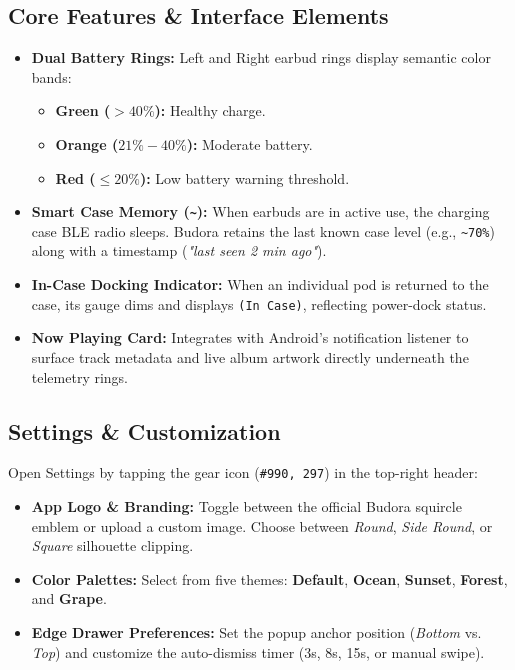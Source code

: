 \documentclass[11pt,a4paper]{article}
\begin{document}
\subsection{Core Features \& Interface Elements}
\begin{itemize}
    \item \textbf{Dual Battery Rings:} Left and Right earbud rings display semantic color bands:
    \begin{itemize}
        \item \color{BudoraGreen}\textbf{Green ($> 40\%$):} \color{black} Healthy charge.
        \item \color{BudoraOrange}\textbf{Orange ($21\% - 40\%$):} \color{black} Moderate battery.
        \item \color{BudoraRed}\textbf{Red ($\le 20\%$):} \color{black} Low battery warning threshold.
    \end{itemize}
    \item \textbf{Smart Case Memory (\texttt{\~{}}):} When earbuds are in active use, the charging case BLE radio sleeps. Budora retains the last known case level (e.g., \texttt{\~{}70\%}) along with a timestamp (\textit{"last seen 2 min ago"}).
    \item \textbf{In-Case Docking Indicator:} When an individual pod is returned to the case, its gauge dims and displays \texttt{(In Case)}, reflecting power-dock status.
    \item \textbf{Now Playing Card:} Integrates with Android's notification listener to surface track metadata and live album artwork directly underneath the telemetry rings.
\end{itemize}

\subsection{Settings \& Customization}
Open Settings by tapping the gear icon (\texttt{\#990, 297}) in the top-right header:
\begin{itemize}
    \item \textbf{App Logo \& Branding:} Toggle between the official Budora squircle emblem or upload a custom image. Choose between \textit{Round}, \textit{Side Round}, or \textit{Square} silhouette clipping.
    \item \textbf{Color Palettes:} Select from five themes: \textbf{Default}, \textbf{Ocean}, \textbf{Sunset}, \textbf{Forest}, and \textbf{Grape}.
    \item \textbf{Edge Drawer Preferences:} Set the popup anchor position (\textit{Bottom} vs. \textit{Top}) and customize the auto-dismiss timer (3s, 8s, 15s, or manual swipe).
\end{itemize}
\end{document}
